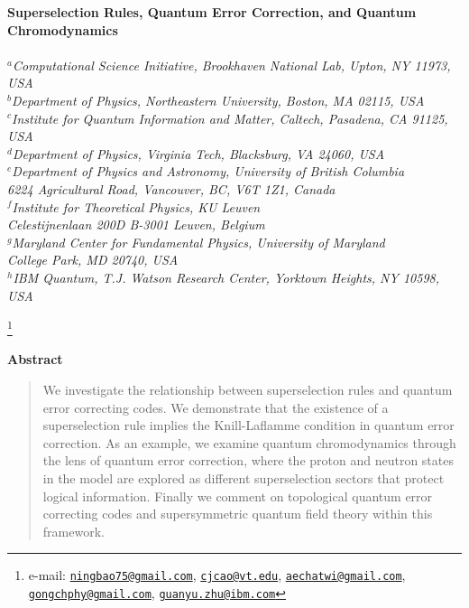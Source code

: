 \documentclass[11pt,english]{article}
\newcommand{\email}[1]{\href{mailto:#1}{\nolinkurl{#1}}}
\begin{document}
\baselineskip=18pt

\hfill


\thispagestyle{empty}
\begin{center}
{\LARGE \bf
Superselection Rules, Quantum Error Correction, and Quantum Chromodynamics}\\
\bigskip{} \\[7mm]
 {\it
 ${}^a$Computational Science Initiative, Brookhaven National Lab, Upton, NY  11973, USA\\[1.5mm]
 ${}^b$Department of Physics, Northeastern University, Boston, MA 02115, USA\\[1.5mm]
 ${}^c$Institute for Quantum Information and Matter, Caltech, Pasadena, CA 91125, USA\\[1.5mm]
 ${}^d$Department of Physics, Virginia Tech, Blacksburg, VA 24060, USA\\[1.5mm]
 ${}^e$Department of Physics and Astronomy, University of British Columbia\\[-1mm]
 6224 Agricultural Road, Vancouver, BC, V6T 1Z1, Canada\\[1.5mm]
 ${}^f$Institute for Theoretical Physics, KU Leuven\\[-1mm]
 Celestijnenlaan 200D B-3001 Leuven, Belgium \\[1.5mm]
 ${}^g$Maryland Center for Fundamental Physics, University of Maryland\\[-1mm]
 College Park, MD 20740, USA \\[1.5mm]
 ${}^h$IBM Quantum, T.J. Watson Research Center, Yorktown Heights, NY 10598, USA }

 
 \let\thefootnote\relax\footnote{\noindent e-mail: \email{ningbao75@gmail.com}, \email{cjcao@vt.edu}, \email{aechatwi@gmail.com}, \email{gongchphy@gmail.com}, \email{guanyu.zhu@ibm.com}} \\
 \bigskip\vspace{0.5cm}{\today}
 \end{center}
\bigskip
\centerline{\large\bf Abstract}
\begin{quote} \small
We investigate the relationship between superselection rules and quantum error correcting codes. We demonstrate that the existence of a superselection rule implies the Knill-Laflamme condition in quantum error correction. As an example, we examine quantum chromodynamics through the lens of quantum error correction, where the proton and neutron states in the model are explored as different superselection sectors that protect logical information.
Finally we comment on topological quantum error correcting codes and supersymmetric quantum field theory within this framework.
\end{quote}
\end{document}
